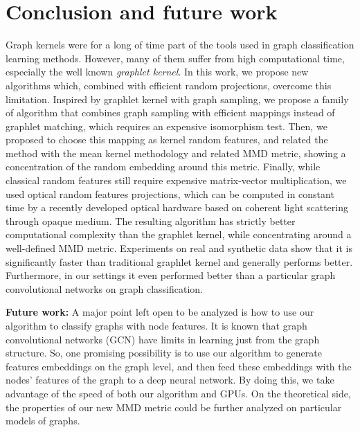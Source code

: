\section{Conclusion and future work}
Graph kernels were for a long of time part of the tools used in graph classification learning methods. However, many of them suffer from high computational time, especially the well known \emph{graphlet kernel}. In this work, we propose  new algorithms which, combined with efficient random projections, overcome this limitation. Inspired by graphlet kernel with graph sampling, we propose a family of algorithm that combines graph sampling with efficient mappings instead of graphlet matching, which requires an expensive isomorphism test. Then, we proposed to choose this mapping as kernel random features, and related the method with the mean kernel methodology and related MMD metric, showing a concentration of the random embedding around this metric. Finally, while classical random features still require expensive matrix-vector multiplication, we used optical random features projections, which can be computed in constant time by a recently developed optical hardware based on coherent light scattering through opaque medium. The resulting algorithm has strictly better computational complexity than the graphlet kernel, while concentrating around a well-defined MMD metric. Experiments on real and synthetic data show that it is significantly faster than traditional graphlet kernel and generally performs better. Furthermore, in our settings it even performed better than a particular graph convolutional networks on graph classification.

\textbf{Future work:} A major point left open to be analyzed is how to use our algorithm to classify graphs with node features. It is known that graph convolutional networks (GCN) have limits in learning just from the graph structure. So, one promising possibility is to use our algorithm to generate features embeddings on the graph level, and then feed these embeddings with the nodes' features of the graph to a deep neural network. By doing this, we take advantage of the speed of both our algorithm and GPUs. On the theoretical side, the properties of our new MMD metric could be further analyzed on particular models of graphs.



